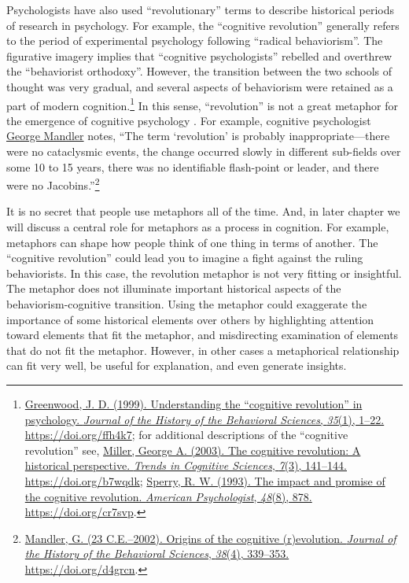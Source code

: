 \documentclass[
  oneside,
  12pt]{crumpbook}
\begin{document}
Psychologists have also used ``revolutionary'' terms to describe historical periods of research in psychology. For example, the ``cognitive revolution'' generally refers to the period of experimental psychology following ``radical behaviorism''. The figurative imagery implies that ``cognitive psychologists'' rebelled and overthrew the ``behaviorist orthodoxy''. However, the transition between the two schools of thought was very gradual, and several aspects of behaviorism were retained as a part of modern cognition.\footnote{\protect\hyperlink{ref-greenwoodUnderstandingCognitiveRevolution1999}{Greenwood, J. D. (1999). Understanding the {``cognitive revolution''} in psychology. \emph{Journal of the History of the Behavioral Sciences}, \emph{35}(1), 1--22. \url{https://doi.org/ffh4k7}}; for additional descriptions of the ``cognitive revolution'' see, \protect\hyperlink{ref-millerCognitiveRevolutionHistorical2003}{Miller, George A. (2003). The cognitive revolution: A historical perspective. \emph{Trends in Cognitive Sciences}, \emph{7}(3), 141--144. \url{https://doi.org/b7wqdk}}; \protect\hyperlink{ref-sperryImpactPromiseCognitive1993}{Sperry, R. W. (1993). The impact and promise of the cognitive revolution. \emph{American Psychologist}, \emph{48}(8), 878. \url{https://doi.org/cr7svp}}.} In this sense, ``revolution'' is not a great metaphor for the emergence of cognitive psychology . For example, cognitive psychologist \href{https://en.wikipedia.org/wiki/George_Mandler}{George Mandler} notes, ``The term `revolution' is probably inappropriate---there were no cataclysmic events, the change occurred slowly in different sub-fields over some 10 to 15 years, there was no identifiable flash-point or leader, and there were no Jacobins.''\footnote{\protect\hyperlink{ref-mandlerOriginsCognitiveEvolution23}{Mandler, G. (23 C.E.--2002). Origins of the cognitive (r)evolution. \emph{Journal of the History of the Behavioral Sciences}, \emph{38}(4), 339--353. \url{https://doi.org/d4grcn}}.}

It is no secret that people use metaphors all of the time. And, in later chapter we will discuss a central role for metaphors as a process in cognition. For example, metaphors can shape how people think of one thing in terms of another. The ``cognitive revolution'' could lead you to imagine a fight against the ruling behaviorists. In this case, the revolution metaphor is not very fitting or insightful. The metaphor does not illuminate important historical aspects of the behaviorism-cognitive transition. Using the metaphor could exaggerate the importance of some historical elements over others by highlighting attention toward elements that fit the metaphor, and misdirecting examination of elements that do not fit the metaphor. However, in other cases a metaphorical relationship can fit very well, be useful for explanation, and even generate insights.
\end{document}
